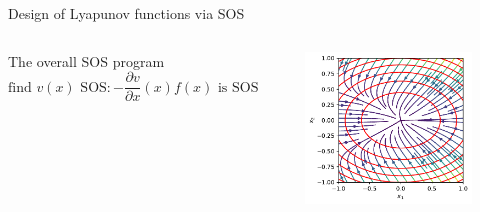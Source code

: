 \documentclass[aspectratio=169]{beamer}
\begin{document}
\begin{frame}{Design of Lyapunov functions via SOS
\href{https://colab.research.google.com/github/TobiaMarcucci/optimal_control_pisa/blob/master/demos/lyapunov_poly.ipynb}{}}
\begin{columns}
\begin{block}{The overall SOS program}
$$
\text{find } v(x) \text{ SOS} : - \frac{\partial v}{\partial x}(x) f(x) \text{ is SOS}
$$
\end{block}
\begin{figure}
\includegraphics[width=\columnwidth]{figures/lyapunov_poly_1.pdf}

\end{figure}
\end{columns}
\end{frame}
\end{document}
